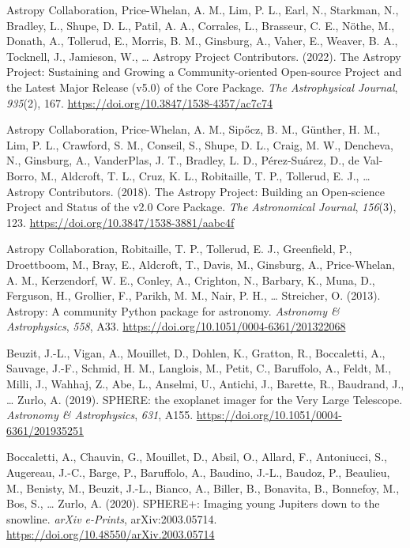 \documentclass[
]{article}
\newlength{\cslhangindent}
\newenvironment{CSLReferences}[2] %
 {\begin{list}{}{%
  \setlength{\itemindent}{0pt}
  \setlength{\leftmargin}{0pt}
  \setlength{\parsep}{0pt}
  \ifodd #1
   \setlength{\leftmargin}{\cslhangindent}
   \setlength{\itemindent}{-1\cslhangindent}
  \fi
  \setlength{\itemsep}{#2\baselineskip}}}
 {\end{list}}
\begin{document}
\protect{}\label{refs}
\begin{CSLReferences}{1}{0}
Astropy Collaboration, Price-Whelan, A. M., Lim, P. L., Earl, N.,
Starkman, N., Bradley, L., Shupe, D. L., Patil, A. A., Corrales, L.,
Brasseur, C. E., Nöthe, M., Donath, A., Tollerud, E., Morris, B. M.,
Ginsburg, A., Vaher, E., Weaver, B. A., Tocknell, J., Jamieson, W.,
\ldots{} Astropy Project Contributors. (2022). {The Astropy Project:
Sustaining and Growing a Community-oriented Open-source Project and the
Latest Major Release (v5.0) of the Core Package}. \emph{The
Astrophysical Journal}, \emph{935}(2), 167.
\url{https://doi.org/10.3847/1538-4357/ac7c74}

Astropy Collaboration, Price-Whelan, A. M., Sipőcz, B. M., Günther, H.
M., Lim, P. L., Crawford, S. M., Conseil, S., Shupe, D. L., Craig, M.
W., Dencheva, N., Ginsburg, A., VanderPlas, J. T., Bradley, L. D.,
Pérez-Suárez, D., de Val-Borro, M., Aldcroft, T. L., Cruz, K. L.,
Robitaille, T. P., Tollerud, E. J., \ldots{} Astropy Contributors.
(2018). {The Astropy Project: Building an Open-science Project and
Status of the v2.0 Core Package}. \emph{The Astronomical Journal},
\emph{156}(3), 123. \url{https://doi.org/10.3847/1538-3881/aabc4f}

Astropy Collaboration, Robitaille, T. P., Tollerud, E. J., Greenfield,
P., Droettboom, M., Bray, E., Aldcroft, T., Davis, M., Ginsburg, A.,
Price-Whelan, A. M., Kerzendorf, W. E., Conley, A., Crighton, N.,
Barbary, K., Muna, D., Ferguson, H., Grollier, F., Parikh, M. M., Nair,
P. H., \ldots{} Streicher, O. (2013). {Astropy: A community Python
package for astronomy}. \emph{Astronomy \& Astrophysics}, \emph{558},
A33. \url{https://doi.org/10.1051/0004-6361/201322068}

Beuzit, J.-L., Vigan, A., Mouillet, D., Dohlen, K., Gratton, R.,
Boccaletti, A., Sauvage, J.-F., Schmid, H. M., Langlois, M., Petit, C.,
Baruffolo, A., Feldt, M., Milli, J., Wahhaj, Z., Abe, L., Anselmi, U.,
Antichi, J., Barette, R., Baudrand, J., \ldots{} Zurlo, A. (2019).
{SPHERE: the exoplanet imager for the Very Large Telescope}.
\emph{Astronomy \& Astrophysics}, \emph{631}, A155.
\url{https://doi.org/10.1051/0004-6361/201935251}

Boccaletti, A., Chauvin, G., Mouillet, D., Absil, O., Allard, F.,
Antoniucci, S., Augereau, J.-C., Barge, P., Baruffolo, A., Baudino,
J.-L., Baudoz, P., Beaulieu, M., Benisty, M., Beuzit, J.-L., Bianco, A.,
Biller, B., Bonavita, B., Bonnefoy, M., Bos, S., \ldots{} Zurlo, A.
(2020). {SPHERE+: Imaging young Jupiters down to the snowline}.
\emph{arXiv e-Prints}, arXiv:2003.05714.
\url{https://doi.org/10.48550/arXiv.2003.05714}


\end{CSLReferences}
\end{document}

